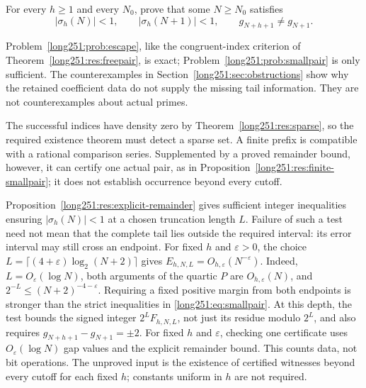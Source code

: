 \begin{problem}\label{long251:prob:smallpair}
For every $h\ge1$ and every $N_0$, prove that some $N\ge N_0$ satisfies
\begin{equation}
 \bigl|\sigma_h(N)\bigr|<1,\qquad
 \bigl|\sigma_h(N+1)\bigr|<1,\qquad
 g_{N+h+1}\ne g_{N+1} .
\label{long251:eq:smallpair}
\end{equation}
\end{problem}

Problem~\ref{long251:prob:escape}, like the congruent-index criterion of
Theorem~\ref{long251:res:freepair}, is exact;
Problem~\ref{long251:prob:smallpair} is only sufficient.
The counterexamples in Section~\ref{long251:sec:obstructions} show why
the retained coefficient data do not supply the missing tail information.
They are not counterexamples about actual primes.

The successful indices have density zero by
Theorem~\ref{long251:res:sparse}, so the required existence theorem
must detect a sparse set.  A finite prefix is compatible with a rational
comparison series.  Supplemented by a proved remainder bound, however,
it can certify one actual pair, as in
Proposition~\ref{long251:res:finite-smallpair}; it does not establish
occurrence beyond every cutoff.

Proposition~\ref{long251:res:explicit-remainder} gives sufficient integer
inequalities ensuring $|\sigma_h(N)|<1$ at a chosen truncation length $L$.
Failure of such a test need not mean that the complete tail lies outside
the required interval: its error interval may still cross an endpoint.
For fixed $h$ and $\varepsilon>0$, the choice
$L=\lceil(4+\varepsilon)\log_2(N+2)\rceil$ gives
$E_{h,N,L}=O_{h,\varepsilon}(N^{-\varepsilon})$.
Indeed, $L=O_\varepsilon(\log N)$, both arguments of the quartic $P$ are
$O_{h,\varepsilon}(N)$, and $2^{-L}\le(N+2)^{-4-\varepsilon}$.
Requiring a fixed positive margin from both endpoints is stronger than
the strict inequalities in \eqref{long251:eq:smallpair}.  At this depth,
the test bounds the signed integer $2^LF_{h,N,L}$, not just its residue
modulo $2^L$, and also requires $g_{N+h+1}-g_{N+1}=\pm2$.
For fixed $h$ and $\varepsilon$, checking one certificate uses
$O_\varepsilon(\log N)$ gap values and the explicit remainder bound.
This counts data, not bit operations.  The unproved input is the
existence of certified witnesses beyond every cutoff for each fixed $h$;
constants uniform in $h$ are not required.

